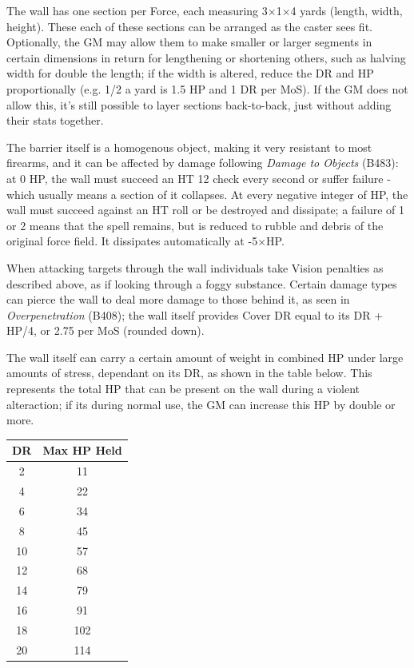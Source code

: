 \begin{multicols*}{3}
	The wall has one section per Force, each measuring 3$\times$1$\times$4 yards (length, width, height). These each of these sections can be arranged as the caster sees fit. Optionally, the GM may allow them to make smaller or larger segments in certain dimensions in return for lengthening or shortening others, such as halving width for double the length; if the width is altered, reduce the DR and HP proportionally (e.g. 1/2 a yard is 1.5 HP and 1 DR per MoS). If the GM does not allow this, it's still possible to layer sections back-to-back, just without adding their stats together.
	
	The barrier itself is a homogenous object, making it very resistant to most firearms, and it can be affected by damage following \textit{Damage to Objects} (B483): at 0 HP, the wall must succeed an HT 12 check every second or suffer failure - which usually means a section of it collapses. At every negative integer of HP, the wall must succeed against an HT roll or be destroyed and dissipate; a failure of 1 or 2 means that the spell remains, but is reduced to rubble and debris of the original force field. It dissipates automatically at -5$\times$HP.
	
	When attacking targets through the wall individuals take Vision penalties as described above, as if looking through a foggy substance. Certain damage types can pierce the wall to deal more damage to those behind it, as seen in \textit{Overpenetration} (B408); the wall itself provides Cover DR equal to its DR + HP/4, or 2.75 per MoS (rounded down).
	
	The wall itself can carry a certain amount of weight in combined HP under large amounts of stress, dependant on its DR, as shown in the table below. This represents the total HP that can be present on the wall during a violent alteraction; if its during normal use, the GM can increase this HP by double or more.
	
	\begin{center}
		\begin{tabular}{|c|c|}
			\hline
			DR & Max HP Held \\
			\hline
			\hline
			2 & 11 \\
			4 & 22 \\
			6 & 34 \\
			8 & 45 \\
			10 & 57 \\
			12 & 68 \\
			14 & 79 \\
			16 & 91 \\
			18 & 102 \\
			20 & 114 \\
			\hline
		\end{tabular}
	\end{center}	
		

\end{multicols*}
